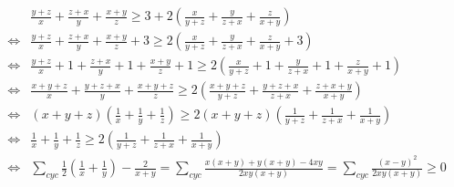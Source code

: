 \documentclass[12pt]{article}
\begin{document}
\pagebreak 
\vspace*{4cm}
	
\Huge{\begin{align*}
& \frac{y+z}{x} + \frac{z+x}{y} + \frac{x+y}{z} \geq 3+2\left(\frac{x}{y+z}+\frac{y}{z+x}+\frac{z}{x+y}\right)\\[5mm]
\iff & \frac{y+z}{x} + \frac{z+x}{y} + \frac{x+y}{z} +3\geq 2\left(\frac{x}{y+z}+\frac{y}{z+x}+\frac{z}{x+y}+3\right)\\[5mm]
\iff & \frac{y+z}{x}+1 + \frac{z+x}{y} +1+ \frac{x+y}{z}+1 \geq 2\left(\frac{x}{y+z}+1+\frac{y}{z+x}+1+\frac{z}{x+y}+1\right)\\[5mm]
\iff & \frac{x+y+z}{x} + \frac{y+z+x}{y} + \frac{x+y+z}{z} \geq 2\left(\frac{x+y+z}{y+z}+\frac{y+z+x}{z+x}+\frac{z+x+y}{x+y}\right)\\[5mm]
\iff & (x+y+z)\left(\frac{1}{x} + \frac{1}{y} + \frac{1}{z}\right) \geq 2(x+y+z)\left(\frac{1}{y+z}+\frac{1}{z+x}+\frac{1}{x+y}\right) \\[5mm] 
\iff & \frac{1}{x} + \frac{1}{y} + \frac{1}{z}\geq 2\left(\frac{1}{y+z}+\frac{1}{z+x}+\frac{1}{x+y}\right)\\[5mm] 
\iff & \sum_{cyc} \frac{1}{2}\left(\frac{1}{x}+\frac{1}{y}\right)-\frac{2}{x+y}=\sum_{cyc} \frac{x (x+y)+y (x+y)-4xy}{2xy (x+y)}=\sum_{cyc} \frac{(x-y)^2}{2xy (x+y)}\geq 0
\end{align*}}
\end{document}
